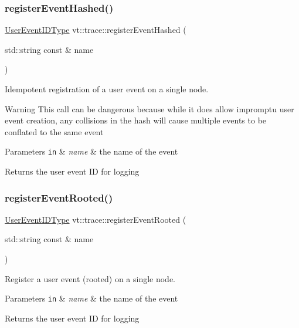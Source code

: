 \subsubsection{\texorpdfstring{register\+Event\+Hashed()}{registerEventHashed()}}
{\footnotesize\ttfamily \hyperlink{namespacevt_1_1trace_a5908920d051c144c89f17c69ed262350}{User\+Event\+I\+D\+Type} vt\+::trace\+::register\+Event\+Hashed (\begin{DoxyParamCaption}\item[{std\+::string const \&}]{name }\end{DoxyParamCaption})}



Idempotent registration of a user event on a single node. 

\begin{DoxyWarning}{Warning}
This call can be dangerous because while it does allow impromptu user event creation, any collisions in the hash will cause multiple events to be conflated to the same event
\end{DoxyWarning}

\begin{DoxyParams}[1]{Parameters}
\mbox{\tt in}  & {\em name} & the name of the event\\
\hline
\end{DoxyParams}
\begin{DoxyReturn}{Returns}
the user event ID for logging 
\end{DoxyReturn}
\mbox{\label{namespacevt_1_1trace_a0cacc6989895f36e577db51e16df1e23}} 
\subsubsection{\texorpdfstring{register\+Event\+Rooted()}{registerEventRooted()}}
{\footnotesize\ttfamily \hyperlink{namespacevt_1_1trace_a5908920d051c144c89f17c69ed262350}{User\+Event\+I\+D\+Type} vt\+::trace\+::register\+Event\+Rooted (\begin{DoxyParamCaption}\item[{std\+::string const \&}]{name }\end{DoxyParamCaption})}



Register a user event (rooted) on a single node. 


\begin{DoxyParams}[1]{Parameters}
\mbox{\tt in}  & {\em name} & the name of the event\\
\hline
\end{DoxyParams}
\begin{DoxyReturn}{Returns}
the user event ID for logging 
\end{DoxyReturn}
